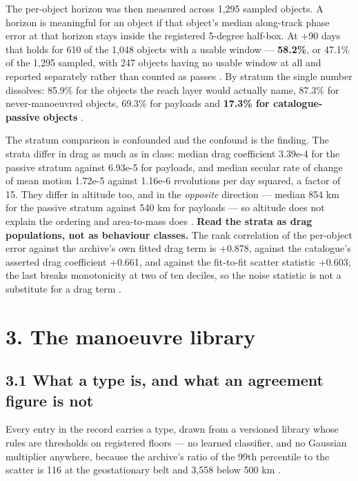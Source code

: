 \documentclass[11pt]{article}
\begin{document}
The per-object horizon was then measured across 1,295 sampled objects. A horizon is meaningful for an object if that object's median along-track phase error at that horizon stays inside the registered 5-degree half-box. At +90 days that holds for 610 of the 1,048 objects with a usable window --- \textbf{58.2\%}, or 47.1\% of the 1,295 sampled, with 247 objects having no usable window at all and reported separately rather than counted as passes%
. By stratum the single number dissolves: 85.9\% for the objects the reach layer would actually name, 87.3\% for never-manoeuvred objects, 69.3\% for payloads and \textbf{17.3\% for catalogue-passive objects}%
.

The stratum comparison is confounded and the confound is the finding. The strata differ in drag as much as in class: median drag coefficient 3.39e-4 for the passive stratum against 6.93e-5 for payloads, and median secular rate of change of mean motion 1.72e-5 against 1.16e-6 revolutions per day squared, a factor of 15. They differ in altitude too, and in the \emph{opposite} direction --- median 854 km for the passive stratum against 540 km for payloads --- so altitude does not explain the ordering and area-to-mass does%
. \textbf{Read the strata as drag populations, not as behaviour classes.} The rank correlation of the per-object error against the archive's own fitted drag term is +0.878, against the catalogue's asserted drag coefficient +0.661, and against the fit-to-fit scatter statistic +0.603; the last breaks monotonicity at two of ten deciles, so the noise statistic is not a substitute for a drag term%
.

\section*{3. The manoeuvre library}

\subsection*{3.1 What a type is, and what an agreement figure is not}

Every entry in the record carries a type, drawn from a versioned library whose rules are thresholds on registered floors --- no learned classifier, and no Gaussian multiplier anywhere, because the archive's ratio of the 99th percentile to the scatter is 116 at the geostationary belt and 3,558 below 500 km%
.
\end{document}
